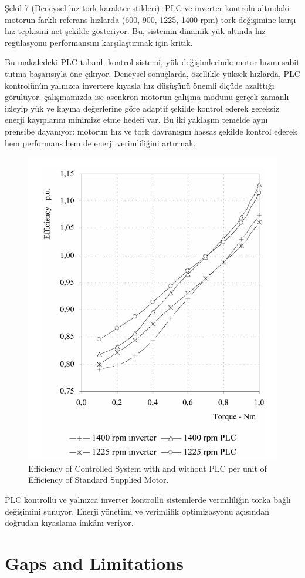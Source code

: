 Şekil 7 (Deneysel hız-tork karakteristikleri): PLC ve inverter kontrolü altındaki motorun farklı referans hızlarda (600, 900, 1225, 1400 rpm) tork değişimine karşı hız tepkisini net şekilde gösteriyor. Bu, sistemin dinamik yük altında hız regülasyonu performansını karşılaştırmak için kritik.

Bu makaledeki PLC tabanlı kontrol sistemi, yük değişimlerinde motor hızını sabit tutma başarısıyla öne çıkıyor. Deneysel sonuçlarda, özellikle yüksek hızlarda, PLC kontrolünün yalnızca invertere kıyasla hız düşüşünü önemli ölçüde azalttığı görülüyor. çalışmamızda ise asenkron motorun çalışma modunu gerçek zamanlı izleyip yük ve kayma değerlerine göre adaptif şekilde kontrol ederek gereksiz enerji kayıplarını minimize etme hedefi var. Bu iki yaklaşım temelde aynı prensibe dayanıyor: motorun hız ve tork davranışını hassas şekilde kontrol ederek hem performans hem de enerji verimliliğini artırmak.

\begin{figure}[H]
    \centering
    \includegraphics[width=0.4\columnwidth]{imgs/Efficiency of controlled system with and without PLC per unit of efficiency of standard supplied motor..png}
    \caption[Short description for list of figures]{Efficiency of Controlled System with and without PLC per unit of Efficiency of Standard Supplied Motor.}
    \label{fig-magnitude}
    \end{figure}%

PLC kontrollü ve yalnızca inverter kontrollü sistemlerde verimliliğin torka bağlı değişimini sunuyor. Enerji yönetimi ve verimlilik optimizasyonu açısından doğrudan kıyaslama imkânı veriyor.

\section{Gaps and Limitations}

